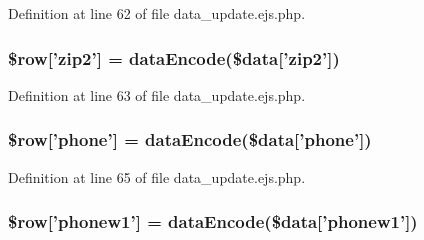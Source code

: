 \-Definition at line 62 of file data\-\_\-update.\-ejs.\-php.

\hypertarget{miscellaneous_2mysettings_2data__update_8ejs_8php_a5d1c42367c8080fb4096e84cb9b929b1}{
\subsubsection[{\$row}]{\setlength{\rightskip}{0pt plus 5cm}\$row\mbox{[}'zip2'\mbox{]} = {\bf data\-Encode}(\$data\mbox{[}'zip2'\mbox{]})}}\label{miscellaneous_2mysettings_2data__update_8ejs_8php_a5d1c42367c8080fb4096e84cb9b929b1}


\-Definition at line 63 of file data\-\_\-update.\-ejs.\-php.

\hypertarget{miscellaneous_2mysettings_2data__update_8ejs_8php_a9eb773d64ffa16faf1e29ccbaf4f065c}{
\subsubsection[{\$row}]{\setlength{\rightskip}{0pt plus 5cm}\$row\mbox{[}'phone'\mbox{]} = {\bf data\-Encode}(\$data\mbox{[}'phone'\mbox{]})}}\label{miscellaneous_2mysettings_2data__update_8ejs_8php_a9eb773d64ffa16faf1e29ccbaf4f065c}


\-Definition at line 65 of file data\-\_\-update.\-ejs.\-php.

\hypertarget{miscellaneous_2mysettings_2data__update_8ejs_8php_abd903592f46e704ef4bf1d9b96891334}{
\subsubsection[{\$row}]{\setlength{\rightskip}{0pt plus 5cm}\$row\mbox{[}'phonew1'\mbox{]} = {\bf data\-Encode}(\$data\mbox{[}'phonew1'\mbox{]})}}\label{miscellaneous_2mysettings_2data__update_8ejs_8php_abd903592f46e704ef4bf1d9b96891334}


